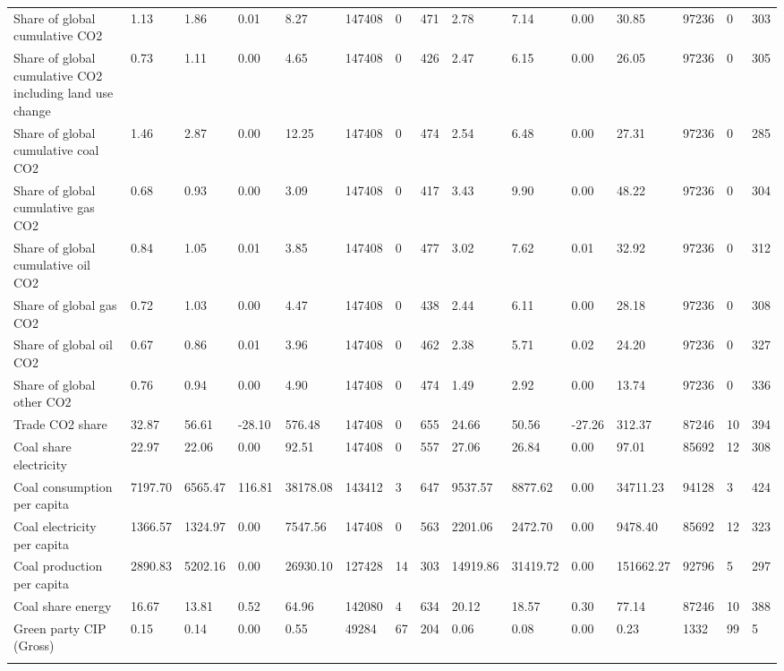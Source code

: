 \begin{longtable}{lllllllllllllll}
\addlinespace
Share of global cumulative CO2 & 1.13 & 1.86 & 0.01 & 8.27 & 147408 & 0 & 471 & 2.78 & 7.14 & 0.00 & 30.85 & 97236 & 0 & 303\\
Share of global cumulative CO2 including land use change & 0.73 & 1.11 & 0.00 & 4.65 & 147408 & 0 & 426 & 2.47 & 6.15 & 0.00 & 26.05 & 97236 & 0 & 305\\
Share of global cumulative coal CO2 & 1.46 & 2.87 & 0.00 & 12.25 & 147408 & 0 & 474 & 2.54 & 6.48 & 0.00 & 27.31 & 97236 & 0 & 285\\
Share of global cumulative gas CO2 & 0.68 & 0.93 & 0.00 & 3.09 & 147408 & 0 & 417 & 3.43 & 9.90 & 0.00 & 48.22 & 97236 & 0 & 304\\
Share of global cumulative oil CO2 & 0.84 & 1.05 & 0.01 & 3.85 & 147408 & 0 & 477 & 3.02 & 7.62 & 0.01 & 32.92 & 97236 & 0 & 312\\
\addlinespace
Share of global gas CO2 & 0.72 & 1.03 & 0.00 & 4.47 & 147408 & 0 & 438 & 2.44 & 6.11 & 0.00 & 28.18 & 97236 & 0 & 308\\
Share of global oil CO2 & 0.67 & 0.86 & 0.01 & 3.96 & 147408 & 0 & 462 & 2.38 & 5.71 & 0.02 & 24.20 & 97236 & 0 & 327\\
Share of global other CO2 & 0.76 & 0.94 & 0.00 & 4.90 & 147408 & 0 & 474 & 1.49 & 2.92 & 0.00 & 13.74 & 97236 & 0 & 336\\
Trade CO2 share & 32.87 & 56.61 & -28.10 & 576.48 & 147408 & 0 & 655 & 24.66 & 50.56 & -27.26 & 312.37 & 87246 & 10 & 394\\
Coal share electricity & 22.97 & 22.06 & 0.00 & 92.51 & 147408 & 0 & 557 & 27.06 & 26.84 & 0.00 & 97.01 & 85692 & 12 & 308\\
\addlinespace
Coal consumption per capita & 7197.70 & 6565.47 & 116.81 & 38178.08 & 143412 & 3 & 647 & 9537.57 & 8877.62 & 0.00 & 34711.23 & 94128 & 3 & 424\\
Coal electricity per capita & 1366.57 & 1324.97 & 0.00 & 7547.56 & 147408 & 0 & 563 & 2201.06 & 2472.70 & 0.00 & 9478.40 & 85692 & 12 & 323\\
Coal production per capita & 2890.83 & 5202.16 & 0.00 & 26930.10 & 127428 & 14 & 303 & 14919.86 & 31419.72 & 0.00 & 151662.27 & 92796 & 5 & 297\\
Coal share energy & 16.67 & 13.81 & 0.52 & 64.96 & 142080 & 4 & 634 & 20.12 & 18.57 & 0.30 & 77.14 & 87246 & 10 & 388\\
Green party CIP (Gross) & 0.15 & 0.14 & 0.00 & 0.55 & 49284 & 67 & 204 & 0.06 & 0.08 & 0.00 & 0.23 & 1332 & 99 & 5\\
\addlinespace

\end{longtable}
